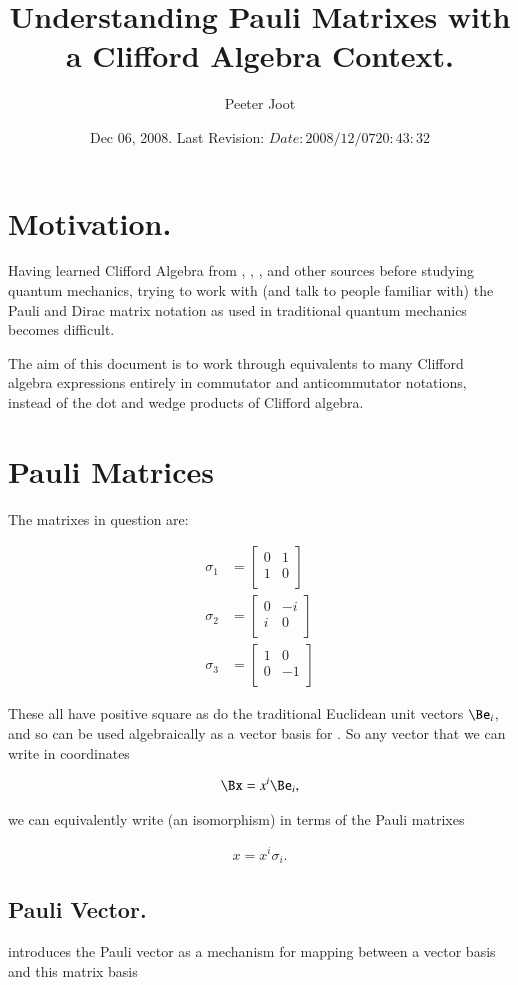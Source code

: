 \documentclass{article}
\title{ Understanding Pauli Matrixes with a Clifford Algebra Context. }
\author{Peeter Joot}
\date{ Dec 06, 2008.  Last Revision: $Date: 2008/12/07 20:43:32 $ }
\newcommand{\PauliX}[0]{
\begin{bmatrix}
0 & 1 \\
1 & 0 \\
\end{bmatrix}
}
\newcommand{\PauliY}[0]{
\begin{bmatrix}
0 & -i \\
i & 0 \\
\end{bmatrix}
}
\newcommand{\PauliZ}[0]{
\begin{bmatrix}
1 & 0 \\
0 & -1 \\
\end{bmatrix}
}
\begin{document}
\maketitle{}

\tableofcontents

\section{ Motivation. }

Having learned Clifford Algebra from 
\cite{doran2003gap}, \cite{hestenes1999nfc}, \cite{dorst2007gac}, and other sources
before studying quantum mechanics, trying to work with (and talk to people familiar with) the Pauli and Dirac matrix notation as used in
traditional quantum mechanics becomes difficult.

The aim of this document is to work through equivalents to many Clifford algebra expressions entirely in
commutator and anticommutator notations, instead of the dot and wedge products of Clifford algebra.

\section{ Pauli Matrices }

The matrixes in question are:

\begin{align}
\sigma_1 &= \PauliX \\
\sigma_2 &= \PauliY \\
\sigma_3 &= \PauliZ
\end{align}

These all have positive square as do the traditional Euclidean unit vectors $\Be_i$, and so can be used algebraically as a vector basis for .  So any vector that we
can write in coordinates

\begin{align*}
\Bx = x^i \Be_i,
\end{align*}

we can equivalently write (an isomorphism) in terms of the Pauli matrixes

\begin{align}\label{eqn:vectorInPauliBasis}
x = x^i \sigma_i.
\end{align}

\subsection{ Pauli Vector. }
\cite{wikipauli} introduces the Pauli vector as a mechanism for mapping between a vector basis and this matrix basis
\end{document}
